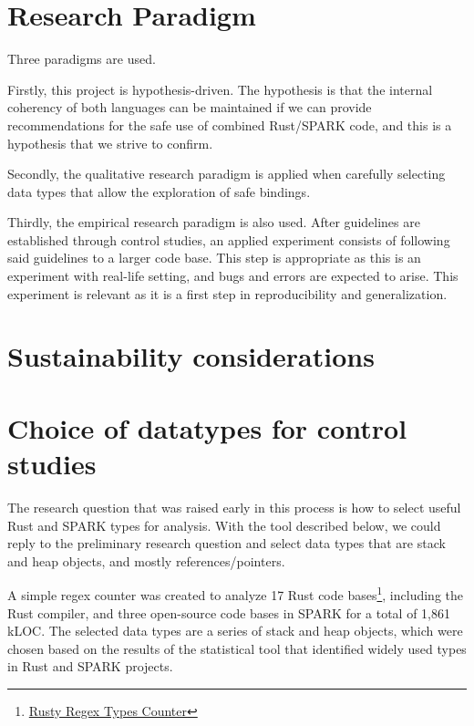 \documentclass[nomenclature, english, bibtex]{kththesis}
\begin{document}
\section{Research Paradigm}
\label{sec:researchParadigm}

Three paradigms are used. 

Firstly, this project is hypothesis-driven. The hypothesis is that the internal coherency of both languages can be maintained if we can provide
recommendations for the safe use of combined Rust/SPARK code, and this is a hypothesis that we strive to confirm.


Secondly, the qualitative research paradigm is applied when carefully selecting data types that allow the exploration of safe bindings.


Thirdly, the empirical research paradigm is also used. After guidelines are established through control studies, an applied experiment consists of following said guidelines to a larger code base. This step is appropriate as this is an experiment with real-life setting, and bugs and errors are expected to arise. This experiment is relevant as it is a first step in reproducibility and generalization.

\section{Sustainability considerations}

\section{Choice of datatypes for control studies}
\label{sec:dataCollection}

The research question that was raised early in this process is how to select useful Rust and SPARK types for analysis. 
With the tool described below, we could reply to the preliminary research question and select data types that are stack and heap objects, and mostly references/pointers. 

A simple regex counter was created to analyze 17 Rust code bases\footnote{\href{https://github.com/Dajamante/stat_ada_rust_code}{Rusty Regex Types Counter}}, including the Rust compiler, and three open-source code bases in SPARK for a total of 1,861 k\gls{LOC}. The selected data types are a series of stack and heap objects, which were chosen based on the results of the statistical tool that identified widely used types in Rust and SPARK projects. 
\end{document}
